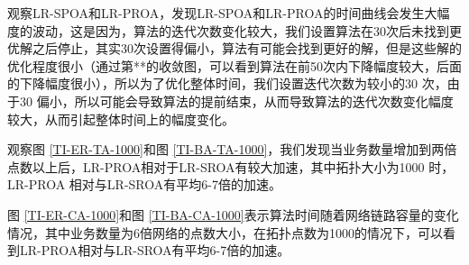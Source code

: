   观察LR-SPOA和LR-PROA，发现LR-SPOA和LR-PROA的时间曲线会发生大幅度的波动，这是因为，算法的迭代次数变化较大，我们设置算法在30次后未找到更优解之后停止，其实30次设置得偏小，算法有可能会找到更好的解，但是这些解的优化程度很小（通过第**的收敛图，可以看到算法在前50次内下降幅度较大，后面的下降幅度很小），所以为了优化整体时间，我们设置迭代次数为较小的30 次，由于30 偏小，所以可能会导致算法的提前结束，从而导致算法的迭代次数变化幅度较大，从而引起整体时间上的幅度变化。

  观察图 \ref{TI-ER-TA-1000}和图 \ref{TI-BA-TA-1000}，我们发现当业务数量增加到两倍点数以上后，LR-PROA相对于LR-SROA有较大加速，其中拓扑大小为1000 时，LR-PROA 相对与LR-SROA有平均6-7倍的加速。

  图 \ref{TI-ER-CA-1000}和图 \ref{TI-BA-CA-1000}表示算法时间随着网络链路容量的变化情况，其中业务数量为6倍网络的点数大小，在拓扑点数为1000的情况下，可以看到LR-PROA相对与LR-SROA有平均6-7倍的加速。

